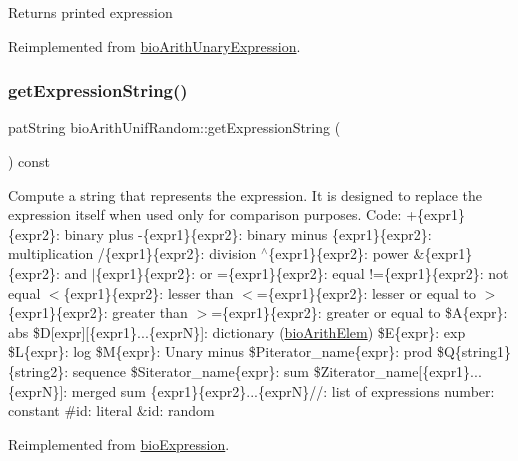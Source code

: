 \begin{DoxyReturn}{Returns}
printed expression 
\end{DoxyReturn}


Reimplemented from \hyperlink{classbio_arith_unary_expression_a974b7779804861f331a75e08db377926}{bio\+Arith\+Unary\+Expression}.

\mbox{\label{classbio_arith_unif_random_a5d53c24c5b584c9ce817c6140b3e6001}} 
\subsubsection{\texorpdfstring{get\+Expression\+String()}{getExpressionString()}}
{\footnotesize\ttfamily pat\+String bio\+Arith\+Unif\+Random\+::get\+Expression\+String (\begin{DoxyParamCaption}{ }\end{DoxyParamCaption}) const\hspace{0.3cm}{\ttfamily [virtual]}}

Compute a string that represents the expression. It is designed to replace the expression itself when used only for comparison purposes. Code\+: +\{expr1\}\{expr2\}\+: binary plus -\/\{expr1\}\{expr2\}\+: binary minus \{expr1\}\{expr2\}\+: multiplication /\{expr1\}\{expr2\}\+: division $^\wedge$\{expr1\}\{expr2\}\+: power \&\{expr1\}\{expr2\}\+: and $\vert$\{expr1\}\{expr2\}\+: or =\{expr1\}\{expr2\}\+: equal !=\{expr1\}\{expr2\}\+: not equal $<$\{expr1\}\{expr2\}\+: lesser than $<$=\{expr1\}\{expr2\}\+: lesser or equal to $>$\{expr1\}\{expr2\}\+: greater than $>$=\{expr1\}\{expr2\}\+: greater or equal to \$A\{expr\}\+: abs \$D\mbox{[}expr\mbox{]}\mbox{[}\{expr1\}...\{exprN\}\mbox{]}\+: dictionary (\hyperlink{classbio_arith_elem}{bio\+Arith\+Elem}) \$E\{expr\}\+: exp \$L\{expr\}\+: log \$M\{expr\}\+: Unary minus \$\+Piterator\+\_\+name\{expr\}\+: prod \$Q\{string1\}\{string2\}\+: sequence \$\+Siterator\+\_\+name\{expr\}\+: sum \$\+Ziterator\+\_\+name\mbox{[}\{expr1\}...\{exprN\}\mbox{]}\+: merged sum \{expr1\}\{expr2\}...\{exprN\}//\+: list of expressions number\+: constant \#id\+: literal \&id\+: random 

Reimplemented from \hyperlink{classbio_expression_a3e4b4dca58dbbc6f0e411b30eb3f60b4}{bio\+Expression}.

